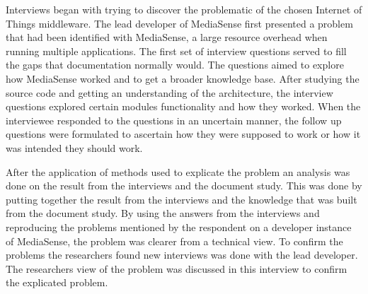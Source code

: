Interviews began with trying to discover the problematic of the chosen Internet of Things middleware. The lead developer of MediaSense first presented a problem that had been identified with MediaSense, a large resource overhead when running multiple applications. The first set of interview questions served to fill the gaps that documentation normally would. The questions aimed to explore how MediaSense worked and to get a broader knowledge base. After studying the source code and getting an understanding of the architecture, the interview questions explored certain modules functionality and how they worked. When the interviewee responded to the questions in an uncertain manner, the follow up questions were formulated to ascertain how they were supposed to work or how it was intended they should work.

After the application of methods used to explicate the problem an analysis was done on the result from the interviews and the document study. This was done by putting together the result from the interviews and the knowledge that was built from the document study. By using the answers from the interviews and reproducing the problems mentioned by the respondent on a developer instance of MediaSense, the problem was clearer from a technical view. To confirm the problems the researchers found new interviews was done with the lead developer. The researchers view of the problem was discussed in this interview to confirm the explicated problem.
